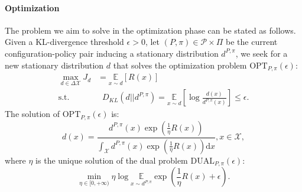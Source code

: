 \paragraph{Optimization} The problem we aim to solve in the optimization phase can be stated as follows. Given a KL-divergence threshold $\epsilon>0$, let $(P,\pi) \in \mathcal{P} \times \Pi$ be the current configuration-policy pair inducing a stationary distribution $d^{P,\pi}$, we seek for a new stationary distribution $d$ that solves the optimization problem $\text{OPT}_{P,\pi}(\epsilon)$:
\begin{align}
	\underset{d \in \Delta{\mathcal{X}}}{\max} J_d &= \underset{x \sim d}{\mathbb{E}} \left[ R(x) \right] \\
	\text{s.t.} & \;\; D_{KL}(d||d^{P,\pi}) = \underset{x \sim d}{\mathbb{E}} \left[ \log \frac{d(x)}{d^{P,\pi}(x)} \right] \leq \epsilon.
\end{align}
The solution of $\text{OPT}_{P,\pi}(\epsilon)$ is:
\begin{equation}
	d(x) = 	\frac{d^{P,\pi}(x) \exp \left( \frac{1}{\eta}R(x) \right)}{\int_{\mathcal{X}}d^{P,\pi}(x) \exp \left( \frac{1}{\eta}R(x) \right) \mathrm{d}x}, x \in \mathcal{X},
\end{equation}
where $\eta$ is the unique solution of the dual problem $\text{DUAL}_{P,\pi}(\epsilon)$:
\begin{equation}
	\min_{\eta \in [0, +\infty)} \eta \log \underset{x \sim d^{P,\pi}}{\mathbb{E}} \exp  \left( \frac{1}{\eta} R(x) + \epsilon \right).
\end{equation}

